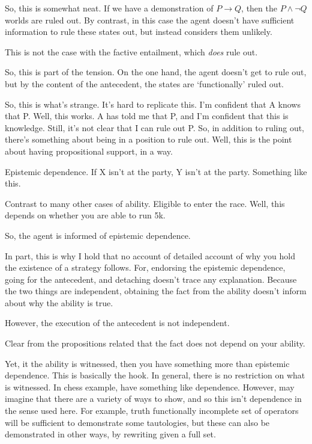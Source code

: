 \documentclass[10pt]{article}
\begin{document}
So, this is somewhat neat.
If we have a demonstration of \(P \rightarrow Q\), then the \(P \land \lnot Q\) worlds are ruled out.
By contrast, in this case the agent doesn't have sufficient information to rule these states out, but instead considers them unlikely.

This is not the case with the factive entailment, which \emph{does} rule out.

So, this is part of the tension.
On the one hand, the agent doesn't get to rule out, but by the content of the antecedent, the states are `functionally' ruled out.

So, this is what's strange.
It's hard to replicate this.
I'm confident that A knows that P.
Well, this works.
A has told me that P, and I'm confident that this is knowledge.
Still, it's not clear that I can rule out P.
So, in addition to ruling out, there's something about being in a position to rule out.
Well, this is the point about having propositional support, in a way.

Epistemic dependence.
If X isn't at the party, Y isn't at the party.
Something like this.

Contrast to many other cases of ability.
Eligible to enter the race.
Well, this depends on whether you are able to run 5k.

So, the agent is informed of epistemic dependence.

In part, this is why I hold that no account of detailed account of why you hold the existence of a strategy follows.
For, endorsing the epistemic dependence, going for the antecedent, and detaching doesn't trace any explanation.
Because the two things are independent, obtaining the fact from the ability doesn't inform about why the ability is true.

However, the execution of the antecedent is not independent.

Clear from the propositions related that the fact does not depend on your ability.

Yet, it the ability is witnessed, then you have something more than epistemic dependence.
This is basically the hook.
In general, there is no restriction on what is witnessed.
In chess example, have something like dependence.
However, may imagine that there are a variety of ways to show, and so this isn't dependence in the sense used here.
For example, truth functionally incomplete set of operators will be sufficient to demonstrate some tautologies, but these can also be demonstrated in other ways, by rewriting given a full set.
\end{document}
